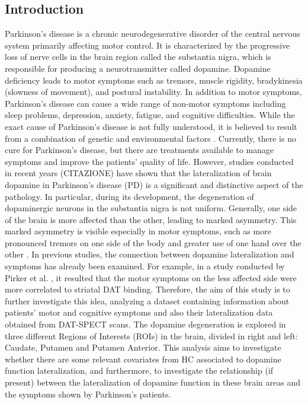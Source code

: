 \documentclass[]{article}
\begin{document}
\begin{multicols}{2}
\section{Introduction}
Parkinson's disease is a chronic neurodegenerative disorder of the central nervous system primarily affecting motor control. It is characterized by the progressive loss of nerve cells in the brain region called the substantia nigra, which is responsible for producing a neurotransmitter called dopamine. Dopamine deficiency leads to motor symptoms such as tremors, muscle rigidity, bradykinesia (slowness of movement), and postural instability. In addition to motor symptoms, Parkinson's disease can cause a wide range of non-motor symptoms including sleep problems, depression, anxiety, fatigue, and cognitive difficulties. While the exact cause of Parkinson's disease is not fully understood, it is believed to result from a combination of genetic and environmental factors \cite{beitz_parkinsons_2014}. Currently, there is no cure for Parkinson's disease, but there are treatments available to manage symptoms and improve the patients’ quality of life.  However, studies conducted in recent years (CITAZIONE) have shown that the lateralization of brain dopamine in Parkinson's disease (PD) is a significant and distinctive aspect of the pathology. In particular, during its development, the degeneration of dopaminergic neurons in the substantia nigra is not uniform. Generally, one side of the brain is more affected than the other, leading to marked asymmetry. This marked asymmetry is visible especially in motor symptoms, such as more pronounced tremors on one side of the body and greater use of one hand over the other \cite{riederer_lateralisation_2018}. 
\newline
In previous studies, the connection between dopamine lateralization and symptoms has already been examined. For example, in a study conducted by Pirker et al. \cite{pirker_correlation_2003}, it resulted that the motor symptoms on the less affected side were more correlated to striatal DAT binding.
\newline
Therefore, the aim of this study is to further investigate this idea, analyzing a dataset containing information about patients' motor and cognitive symptoms and also their lateralization data obtained from DAT-SPECT scans. The dopamine degeneration is explored in three different Regions of Interests (ROIs) in the brain, divided in right and left: Caudate, Putamen and Putamen Anterior. This analysis aims to investigate whether there are some relevant covariates from HC associated to dopamine function lateralization, and furthermore, to investigate the relationship (if present) between the lateralization of dopamine function in these brain areas and the symptoms shown by Parkinson's patients.

\end{multicols}
\end{document}
